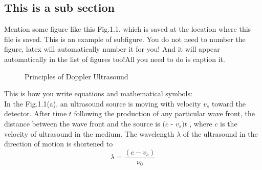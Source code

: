 \subsection{This is a sub section} \label{This is a sub section}
\noindent Mention some figure like this Fig.1.1. which is saved at the location where this file is saved. This is an example of subfigure.
You do not need to number the figure, latex will automatically number it for you! And it will appear automatically in the list of figures too!All you need to do is caption it.
\begin{figure}[H]
\caption{Principles of Doppler Ultrasound}
\end{figure}
\noindent This is how you write equations and mathematical symbols:\\
\noindent In the Fig.1.1(a), an ultrasound source is moving with velocity $v_s$ toward the detector. After time $t$ following the production of any particular wave front, the distance between the wave front and the source is $(c$ - $v_s ) t$ , where $c$ is the velocity of ultrasound in the medium. The wavelength $\lambda$ of the ultrasound in the direction of motion is shortened to
\begin{equation}
\lambda = \frac{(c - v_s )}{\nu_0}
\end{equation}
